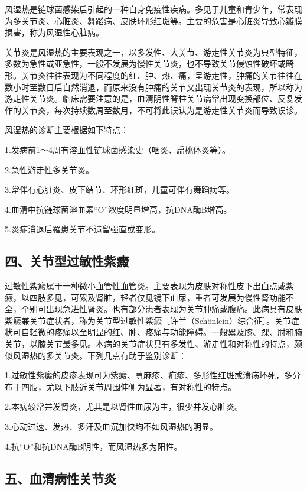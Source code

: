 风湿热是链球菌感染后引起的一种自身免疫性疾病。多见于儿童和青少年，常表现为多关节炎、心脏炎、舞蹈病、皮肤环形红斑等。主要的危害是心脏炎导致心瓣膜损害，称为风湿性心脏病。

关节炎是风湿热的主要表现之一，以多发性、大关节、游走性关节炎为典型特征，多数为急性或亚急性，一般不发展为慢性关节炎，也不导致关节侵蚀性破坏或畸形。关节炎往往表现为不同程度的红、肿、热、痛，呈游走性，肿痛的关节往往在数小时至数日后自然消退，而原来没有肿痛的关节又出现关节炎的表现，所以称为游走性关节炎。临床需要注意的是，血清阴性脊柱关节病常出现变换部位、反复发作的关节炎，每次持续数周至数月，不可将此误认为是游走性关节炎而导致误诊。

风湿热的诊断主要根据如下特点：

1.发病前1～4周有溶血性链球菌感染史（咽炎、扁桃体炎等）。

2.急性游走性多关节炎。

3.常伴有心脏炎、皮下结节、环形红斑，儿童可伴有舞蹈病等。

4.血清中抗链球菌溶血素“O”浓度明显增高，抗DNA酶B增高。

5.炎症消退后罹患关节不遗留强直或变形。

\subsection{四、关节型过敏性紫癜}

过敏性紫癜属于一种微小血管性血管炎。主要表现为皮肤对称性皮下出血点或紫癜，以四肢多见，可累及肾脏，轻者仅见镜下血尿，重者可发展为慢性肾功能不全，个别可出现急进性肾炎。也有部分患者表现为关节肿痛或腹痛。此病具有皮肤紫癜兼关节症状者，称为关节型过敏性紫癜［许兰（Schönlein）综合征］。关节症状可自轻微的疼痛以至明显的红、肿、疼痛与功能障碍。一般累及膝、踝、肘和腕关节，以膝关节最多见。本病的关节症状具有多发性、游走性和对称性的特点，颇似风湿热的多关节炎。下列几点有助于鉴别诊断：

1.过敏性紫癜的皮疹表现可为紫癜、荨麻疹、疱疹、多形性红斑或溃疡坏死，多分布于四肢，尤以下肢近关节周围伸侧为显著，有对称性的特点。

2.本病较常并发肾炎，尤其是以肾性血尿为主，很少并发心脏炎。

3.心动过速、发热、多汗及血沉加快均不如风湿热的明显。

4.抗“O”和抗DNA酶B阴性，而风湿热多为阳性。

\subsection{五、血清病性关节炎}

